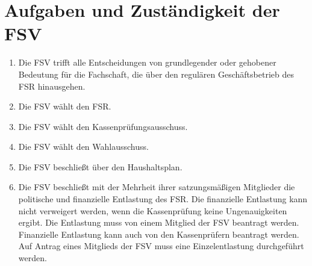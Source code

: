 \documentclass{article}
\begin{document}
\section{Aufgaben und Zuständigkeit der FSV}
\begin{enumerate}[(1)]
    \item Die FSV trifft alle Entscheidungen von grundlegender oder gehobener Bedeutung für die Fachschaft, die über den regulären Geschäftsbetrieb des FSR hinausgehen.
    \item Die FSV wählt den FSR.
	\item Die FSV wählt den Kassenprüfungsausschuss.
	\item Die FSV wählt den Wahlausschuss.
	\item Die FSV beschließt über den Haushaltsplan.
	\item Die FSV beschließt mit der Mehrheit ihrer satzungsmäßigen Mitglieder die politische und finanzielle Entlastung des FSR. Die finanzielle Entlastung kann nicht verweigert werden, wenn die Kassenprüfung keine Ungenauigkeiten ergibt. Die Entlastung muss von einem Mitglied der FSV beantragt werden. Finanzielle Entlastung kann auch von den Kassenprüfern beantragt werden. Auf Antrag eines Mitglieds der FSV muss eine Einzelentlastung durchgeführt werden.
\end{enumerate}
\end{document}
